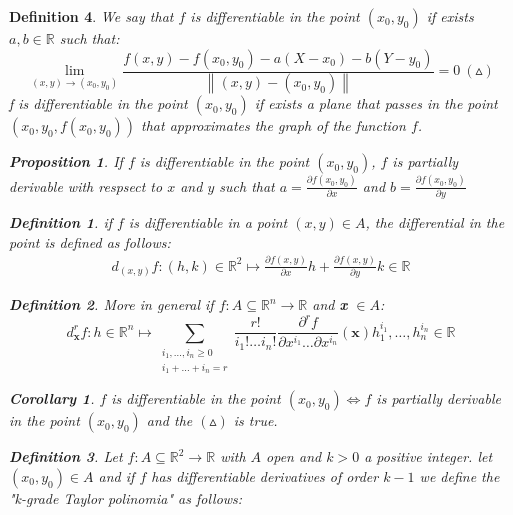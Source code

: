\documentclass{article}
\newtheorem{corollary}{Corollary}
\newtheorem{definition}{Definition}
\newtheorem{proposition}{Proposition}
\begin{document}
    \begin{definition}
        We say that $f$ is differentiable in the point $(x_0, y_0)$ if exists $a,b \in \mathbb{R}$ such that:
        \begin{equation*}
            \lim_{(x, y) \to (x_0,y_0)} \frac{f(x,y)-f(x_0,y_0)-a(X-x_0)-b(Y-y_0)}{\left\lVert (x,y) - (x_0,y_0)\right\rVert } = 0  \ (\vartriangle) 
        \end{equation*}
        f is differentiable in the point $(x_0,y_0)$ if exists a plane that passes in the point $(x_0,y_0, f(x_0,y_0))$ that approximates the graph of the function $f$.
        \begin{proposition}
            If $f$ is differentiable in the point $(x_0,y_0)$, $f$ is partially derivable with respsect to $x$ and $y$ such that $a = \frac{\partial f(x_0,y_0)}{ \partial x}$ and $b = \frac{\partial f(x_0,y_0)}{ \partial y}$  
        \end{proposition}
        \begin{definition}
            if $f$ is differentiable in a point $(x,y) \in A$, the differential in the point is defined as follows:
            \begin{gather*}
                d_{(x,y)}f:(h,k) \in \mathbb{R}^2 \longmapsto \frac{\partial f(x,y)}{\partial x}h + \frac{\partial f(x,y)}{\partial y}k \in \mathbb{R}
            \end{gather*}
        \end{definition}
        \begin{definition}
            More in general if $f:A \subseteq \mathbb{R}^n \rightarrow \mathbb{R}$ and \textbf{x} $\in A$:
            \begin{equation*}
                d_{\textbf{x}}^rf:h \in \mathbb{R}^n \longmapsto \sum_{\substack{i_1, \dots, i_n \geqslant 0 \\ i_1 + \dots + i_n = r}}\frac{r!}{i_1! \dots i_n!}\frac{\partial ^r f}{\partial x^{i_1} \dots \partial x^{i_n}}(\textbf{x}) h^{i_1}_1, \dots,h^{i_n}_n  \in \mathbb{R}
            \end{equation*}
        \end{definition}
        \begin{corollary}
            $f$ is differentiable in the point $(x_0,y_0) \Longleftrightarrow f$ is partially derivable in the point $(x_0,y_0)$ and the $(\vartriangle)$ is true.
        \end{corollary}
    \newpage
        \begin{definition}
            Let $f:A \subseteq \mathbb{R}^2 \rightarrow \mathbb{R}$ with $A$ open and $k> 0$ a positive integer. let $(x_0,y_0) \in A$ and if $f$ has differentiable derivatives of order $k - 1$ we define the "k-grade Taylor polinomia" as follows:

\end{definition}
\end{definition}
\end{document}

